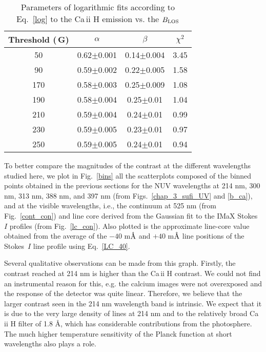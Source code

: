 \documentclass[goettingen, gauss, print]{thesis}
\begin{document}
\begin{table}[h!]
\centering
\caption{Parameters of logarithmic fits according to Eq.~\ref{log} to the Ca\,{\sc ii} H emission vs. the $B_{\rm LOS}$}
\begin{tabular}{||cccc||}
\hline
Threshold (\,G) & $\alpha$ & $\beta$ & $\chi^2$ \\
\hline\hline
50 & 0.62$\pm$0.001&0.14$\pm$0.004&3.45\\
90 &0.59$\pm$0.002&0.22$\pm$0.005&1.58\\
170&0.58$\pm$0.003&0.25$\pm$0.009&1.08\\
190&0.58$\pm$0.004&0.25$\pm$0.01&1.04\\
210&0.59$\pm$0.004&0.24$\pm$0.01&0.99\\
230&0.59$\pm$0.005&0.23$\pm$0.01&0.97\\
250&0.59$\pm$0.005&0.24$\pm$0.01&0.94\\
\hline
\end{tabular}
\label{ca_log}
\end{table}



To better compare the magnitudes of the contrast at the different wavelengths studied here, we plot in Fig.~\ref{bins} all the scatterplots composed of the binned points obtained in the previous sections for the NUV wavelengths at 214 nm, 300 nm, 313 nm, 388 nm, and 397 nm (from Figs.~\ref{chap_3_sufi_UV} and \ref{b_ca}), and at the visible wavelengths, i.e., the continuum at 525 nm (from Fig.~\ref{cont_con}) and line core derived from the Gaussian fit to the IMaX Stokes~$I$ profiles (from Fig.~\ref{lc_con}). Also plotted is the approximate line-core value obtained from the average of the $-40$ m${\textup{\AA}}$ and $+40$ m${\textup{\AA}}$ line positions of the Stokes~$I$ line profile using Eq.~\ref{LC_40}.

Several qualitative observations can be made from this graph. Firstly, the contrast reached at 214 nm is higher than the Ca\,{\sc ii} H contrast. We could not find an instrumental reason for this, e.g. the calcium images were not overexposed and the response of the detector was quite linear. Therefore, we believe that the larger contrast seen in the 214 nm wavelength band is intrinsic. We expect that it is due to the very large density of lines at 214 nm and to the relatively broad Ca\,{\sc ii} H filter of 1.8 \AA{}, which has considerable contributions from the photosphere. The much higher temperature sensitivity of the Planck function at short wavelengths also plays a role.
\end{document}
